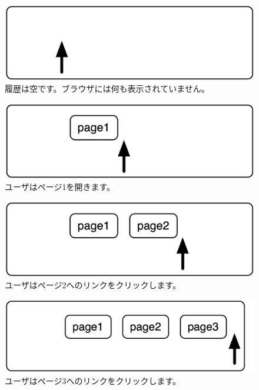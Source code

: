 \documentclass[a4paper,10pt,twoside]{book}
\begin{document}
\begin{figure}[!ht]
\centerline{\includegraphics[scale=0.5]{emptyStef}}
\caption{履歴は空です。ブラウザには何も表示されていません。}
\vspace{.2in}
\end{figure}

\begin{figure}[!ht]
\centerline{\includegraphics[scale=0.5]{page1Stef}}
\caption{ユーザはページ1を開きます。}
\vspace{.2in}
\end{figure}

\begin{figure}[!ht]
\centerline{\includegraphics[scale=0.5]{page2Stef}}
\caption{ユーザはページ2へのリンクをクリックします。}
\vspace{.2in}
\end{figure}

\begin{figure}[!ht]
\centerline{\includegraphics[scale=0.5]{page3Stef}}
\caption{ユーザはページ3へのリンクをクリックします。}
\vspace{.2in}
\end{figure}
\end{document}

